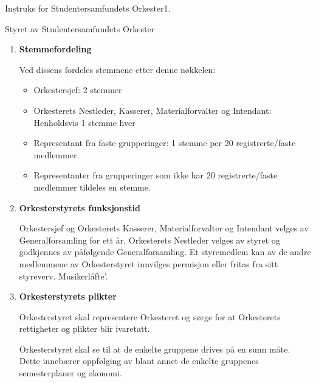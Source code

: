 \begin{instruks}{Instruks for Studentersamfundets Orkester}{1. }{ }
\begin{instruksledd}{Styret av Studentersamfundets Orkester}
\begin{enumerate}
        Observatører med talerett, men uten stemmerett:
        \begin{itemize}
            \item Med møterett: kontaktperson for midlertidige grupperinger godkjent av styret, samt
Orkesterets
funksjonærer og dirigenter.
        \end{itemize}

        Orkesterstyrets sammensetning skal så langt som mulig representere medlemmene av Orkesteret,
med
særskilt hensyn på grupperingenes størrelse, medlemmenes kjønn og etniske bakgrunn/nasjonalitet.
Orkesterstyret ledes av Orkestersjefen, som er gjengsjef. Orkestersjefen velges av Generalforsamling
og må
godkjennes av Storsalen.

        \item \textbf{Stemmefordeling}

        Ved dissens fordeles stemmene etter denne nøkkelen:

        \begin{itemize}
            \item Orkestersjef: 2 stemmer
            \item Orkesterets Nestleder, Kasserer, Materialforvalter og Intendant: Henholdsvis 1
stemme hver
            \item Representant fra faste grupperinger: 1 stemme per 20 registrerte/faste medlemmer.
            \item Representanter fra grupperinger som ikke har 20 registrerte/faste medlemmer
tildeles en stemme.
        \end{itemize}

        \item \textbf{Orkesterstyrets funksjonstid}

Orkestersjef og Orkesterets Kasserer, Materialforvalter og Intendant velges av Generalforsamling for
ett år.
Orkesterets Nestleder velges av styret og godkjennes av påfølgende Generalforsamling. Et styremedlem
kan
av de andre medlemmene av Orkesterstyret innvilges permisjon eller fritas fra sitt styreverv.
Musikerlåfte'.

        \item \textbf{Orkesterstyrets plikter}

Orkesterstyret skal representere Orkesteret og sørge for at Orkesterets rettigheter og plikter blir
ivaretatt.

Orkesterstyret skal se til at de enkelte gruppene drives på en sunn måte. Dette innebærer oppfølging
av blant
annet de enkelte gruppenes semesterplaner og økonomi.


\end{enumerate}
\end{instruksledd}
\end{instruks}
